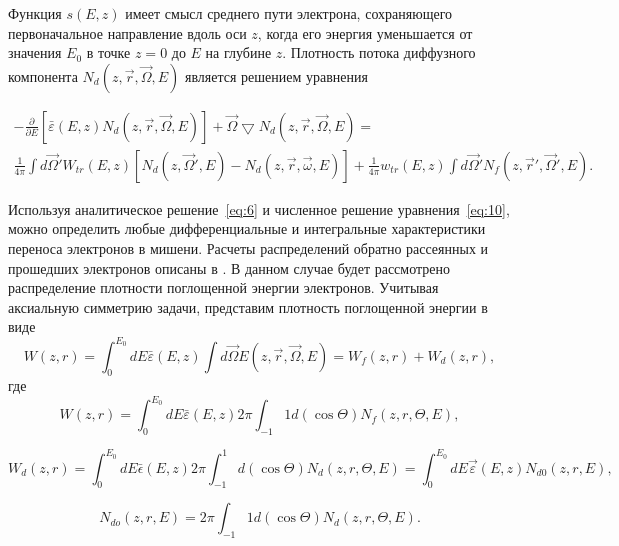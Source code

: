 Функция $s(E, z)$ имеет смысл среднего пути электрона, сохраняющего первоначальное
направление вдоль оси $z$, когда его энергия уменьшается от значения $E_0$ в точке $z=0$ до $E$
на глубине $z$.
Плотность потока диффузного компонента $N_d(z,\vec{r},\vec{\Omega},E)$ является решением
уравнения \cite{smolar}

\begin{gather}
-\frac{\partial}{\partial E}[\bar{\varepsilon}(E,z)N_d(z,\vec{r},\vec{\Omega},E)]+\vec{\Omega} \bigtriangledown N_d (z,\vec{r},\vec{\Omega},E)= \nonumber \\
\frac{1}{4\pi} \int d\vec{\Omega}'W_{tr}(E,z)[N_d(z,\vec{\Omega}',E)-N_d(z,\vec{r},\vec{\omega},E)]+\frac{1}{4\pi}w_{tr}(E,z) \int d\vec{\Omega}'N_f(z,\vec{r}',\vec{\Omega}',E).
\label{eq:10}
\end{gather}

Используя аналитическое решение~\ref{eq:6} и численное решение уравнения~\ref{eq:10}, 
можно определить любые дифференциальные и интегральные характеристики переноса
электронов в мишени. Расчеты распределений обратно рассеянных и прошедших
электронов описаны в \cite{smolar}. В данном случае будет рассмотрено распределение
плотности поглощенной энергии электронов.
Учитывая аксиальную симметрию задачи, представим плотность поглощенной
энергии в виде
\begin{equation}
W(z,r)=\int_{0}^{E_0} dE\bar{\varepsilon}(E,z) \int d\vec{\Omega}E(z,\vec{r},\vec{\Omega},E)=W_f(z,r)+W_d(z,r),
\label{eq:11}
\end{equation}
где
\begin{equation}
W(z,r)=\int_{0}^{E_0} dE\bar{\varepsilon}(E,z)2\pi \int_{-1}{1} d(\cos \Theta)N_f(z,r,\Theta ,E),
\label{eq:12}
\end{equation}

\begin{equation}
W_{d}(z,r)=\int_{0}^{E_0} dE\bar{\epsilon}(E,z)2\pi \int_{-1}^{1} d(\cos \Theta)N_d(z,r,\Theta ,E)=\int_{0}^{E_0}dE\vec{\varepsilon}(E,z)N_{d0}(z,r,E),
\label{eq:13}
\end{equation}

\begin{equation}
N_{do}(z,r,E)=2\pi \int_{-1}{1} d(\cos \Theta)N_d(z,r,\Theta,E).
\label{eq:14}
\end{equation}

